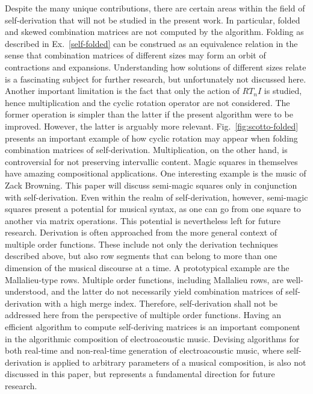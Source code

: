 Despite the many unique contributions, there are certain areas within the field of self-derivation that will not be studied in the present work. In particular, folded and skewed combination matrices are not computed by the algorithm. Folding as described in Ex.~\ref{self-folded} can be construed as an equivalence relation in the sense that combination matrices of different sizes may form an orbit of contractions and expansions. Understanding how solutions of different sizes relate is a fascinating subject for further research, but unfortunately not discussed here. Another important limitation is the fact that only the action of $RT_nI$ is studied, hence multiplication and the cyclic rotation operator are not considered. The former operation is simpler than the latter if the present algorithm were to be improved. However, the latter is arguably more relevant. Fig.~\ref{fig:scotto-folded} presents an important example of how cyclic rotation may appear when folding combination matrices of self-derivation. Multiplication, on the other hand, is controversial for not preserving intervallic content. Magic squares in themselves have amazing compositional applications. One interesting example is the music of Zack Browning. This paper will discuss semi-magic squares only in conjunction with self-derivation. Even within the realm of self-derivation, however, semi-magic squares present a potential for musical syntax, as one can go from one square to another via matrix operations. This potential is nevertheless left for future research. Derivation is often approached from the more general context of multiple order functions. These include not only the derivation techniques described above, but also row segments that can belong to more than one dimension of the musical discourse at a time. A prototypical example are the Mallalieu-type rows. Multiple order functions, including Mallalieu rows, are well-understood, and the latter do not necessarily yield combination matrices of self-derivation with a high merge index. Therefore, self-derivation shall not be addressed here from the perspective of multiple order functions. Having an efficient algorithm to compute self-deriving matrices is an important component in the algorithmic composition of electroacoustic music. Devising algorithms for both real-time and non-real-time generation of electroacoustic music, where self-derivation is applied to arbitrary parameters of a musical composition, is also not discussed in this paper, but represents a fundamental direction for future research.

